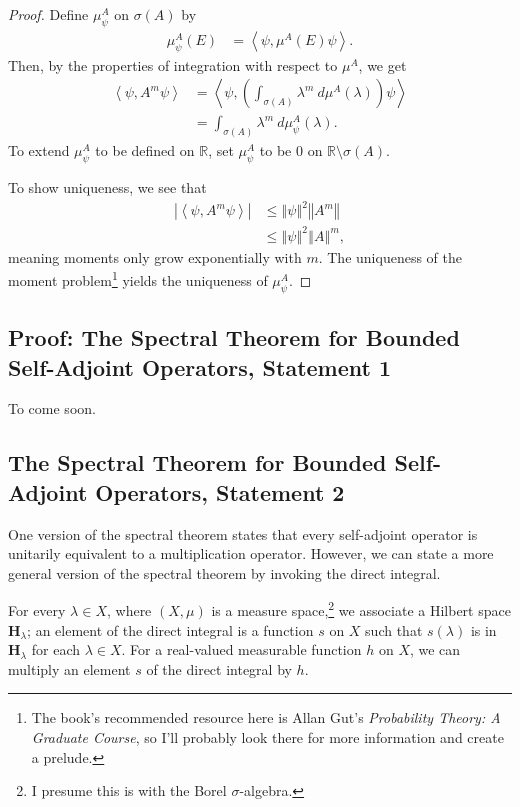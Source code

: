 \documentclass[10pt]{extarticle}
\newcommand{\R}{\mathbb{R}}
\newcommand{\iprod}[2]{\left\langle #1,#2\right\rangle}
\newcommand{\norm}[1]{\left\Vert #1\right\Vert}
\theoremstyle{plain}
\theoremstyle{definition}
\theoremstyle{remark}
\renewcommand{\newline}{\hfill\break}
\begin{document}
  \begin{proof}
    Define $\mu^{A}_{\psi}$ on $\sigma(A)$ by
    \begin{align*}
      \mu^{A}_{\psi}(E) &= \iprod{\psi}{\mu^{A}(E)\psi}.
    \end{align*}
    Then, by the properties of integration with respect to $\mu^{A}$, we get
    \begin{align*}
      \iprod{\psi}{A^{m}\psi} &= \iprod{\psi}{\left(\int_{\sigma(A)}^{} \lambda^{m}\:d\mu^{A}(\lambda)\right)\psi}\\
                              &= \int_{\sigma(A)}^{} \lambda^{m}\:d\mu^{A}_{\psi}(\lambda).
    \end{align*}
    To extend $\mu^{A}_{\psi}$ to be defined on $\R$, set $\mu^{A}_{\psi}$ to be $0$ on $\R\setminus \sigma(A)$.\newline

    To show uniqueness, we see that
    \begin{align*}
      \left\vert \iprod{\psi}{A^{m}\psi} \right\vert &\leq \norm{\psi}^2\norm{A^{m}}\\
                                                     &\leq \norm{\psi}^2\norm{A}^{m},
    \end{align*}
    meaning moments only grow exponentially with $m$. The uniqueness of the moment problem\footnote{The book's recommended resource here is Allan Gut's \textit{Probability Theory: A Graduate Course}, so I'll probably look there for more information and create a prelude.} yields the uniqueness of $\mu^{A}_{\psi}$.
  \end{proof}
  \subsection{Proof: The Spectral Theorem for Bounded Self-Adjoint Operators, Statement 1}%
  To come soon.
  \subsection{The Spectral Theorem for Bounded Self-Adjoint Operators, Statement 2}%
  One version of the spectral theorem states that every self-adjoint operator is unitarily equivalent to a multiplication operator. However, we can state a more general version of the spectral theorem by invoking the direct integral.\newline

  For every $\lambda \in X$, where $(X,\mu)$ is a measure space,\footnote{I presume this is with the Borel $\sigma$-algebra.} we associate a Hilbert space $\mathbf{H}_{\lambda}$; an element of the direct integral is a function $s$ on $X$ such that $s(\lambda)$ is in $\mathbf{H}_{\lambda}$ for each $\lambda \in X$. For a real-valued measurable function $h$ on $X$, we can multiply an element $s$ of the direct integral by $h$.\newline
\end{document}
